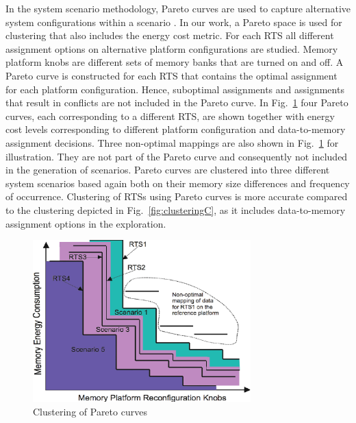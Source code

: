 In the system scenario methodology, Pareto curves are used to capture alternative system configurations within a scenario \cite{tcm}. 
In our work, a Pareto space is used for clustering that also includes the energy cost metric. 
For each RTS all different assignment options on alternative platform configurations are studied. 
Memory platform knobs are different sets of memory banks that are turned on and off.
A Pareto curve is constructed for each RTS that contains the optimal assignment for each platform configuration. 
Hence, suboptimal assignments and assignments that result in conflicts are not included in the Pareto curve. 
In Fig.~\ref{fig:paretoC} four Pareto curves, each corresponding to a different RTS, are shown together with energy cost levels corresponding to different platform configuration and data-to-memory assignment decisions. 
Three non-optimal mappings are also shown in Fig.~\ref{fig:paretoC} for illustration. 
They are not part of the Pareto curve and consequently not included in the generation of scenarios. 
Pareto curves are clustered into three different system scenarios based again both on their memory size differences and frequency of occurrence. 
Clustering of RTSs using Pareto curves is more accurate compared to the clustering depicted in Fig.~\ref{fig:clusteringC}, as it includes data-to-memory assignment options in the exploration. 

\begin{figure}
\centering
\includegraphics[width=0.75\textwidth]{C/2D.pdf}
\caption{Clustering of Pareto curves}
\label{fig:paretoC}
\end{figure}


